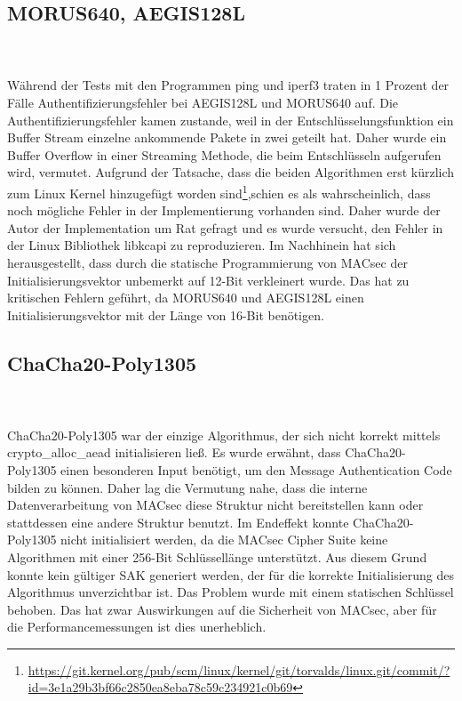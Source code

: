 \subsection{MORUS640, AEGIS128L}
\\
\\
Während der Tests mit den Programmen ping und iperf3 traten in 1 Prozent der Fälle Authentifizierungsfehler bei AEGIS128L und MORUS640 auf. Die Authentifizierungsfehler kamen zustande, weil in der Entschlüsselungsfunktion ein Buffer Stream einzelne ankommende Pakete in zwei geteilt hat. Daher wurde ein Buffer Overflow in einer Streaming Methode, die beim Entschlüsseln aufgerufen wird, vermutet. Aufgrund der Tatsache, dass die beiden Algorithmen erst kürzlich zum Linux Kernel hinzugefügt worden sind\footnote[19]{\url{https://git.kernel.org/pub/scm/linux/kernel/git/torvalds/linux.git/commit/?id=3e1a29b3bf66c2850ea8eba78c59c234921c0b69}},schien es als wahrscheinlich, dass noch mögliche Fehler in der Implementierung vorhanden sind. Daher wurde der Autor der Implementation um Rat gefragt und es wurde versucht, den Fehler in der Linux Bibliothek libkcapi zu reproduzieren.
Im Nachhinein hat sich herausgestellt, dass durch die statische Programmierung von MACsec der Initialisierungsvektor unbemerkt auf 12-Bit verkleinert wurde. Das hat zu kritischen Fehlern geführt, da MORUS640 und AEGIS128L einen Initialisierungsvektor mit der Länge von 16-Bit benötigen. 
\subsection{ChaCha20-Poly1305}
\\
\\
ChaCha20-Poly1305 war der einzige Algorithmus, der sich nicht korrekt mittels crypto\_alloc\_aead initialisieren ließ. Es wurde erwähnt, dass ChaCha20-Poly1305 einen besonderen Input benötigt, um den Message Authentication Code bilden zu können\cite{rfc7539}. Daher lag die Vermutung nahe, dass die interne Datenverarbeitung von MACsec diese Struktur nicht bereitstellen kann oder stattdessen eine andere Struktur benutzt. Im Endeffekt konnte ChaCha20-Poly1305 nicht initialisiert werden, da die MACsec Cipher Suite keine Algorithmen mit einer 256-Bit Schlüssellänge unterstützt. Aus diesem Grund konnte kein gültiger \gls{SAK} generiert werden, der für die korrekte Initialisierung des Algorithmus unverzichtbar ist. Das Problem wurde mit einem statischen Schlüssel behoben. Das hat zwar Auswirkungen auf die Sicherheit von \gls{MACsec}, aber für die Performancemessungen ist dies unerheblich.  
 

